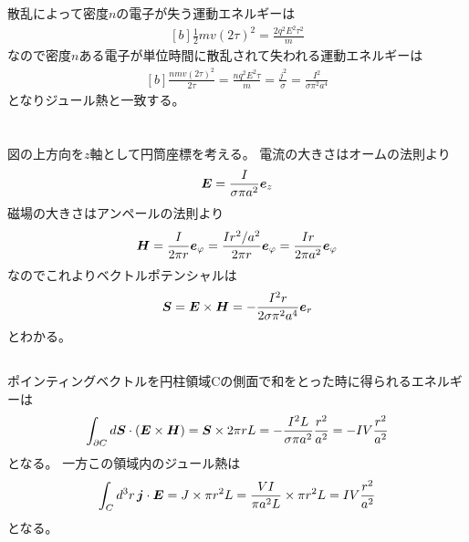 \documentclass[../ap_2012.tex]{subfiles}
\begin{document}
散乱によって密度\(n\)の電子が失う運動エネルギーは
\begin{equation}\begin{aligned}[b]
    \frac{1}{2}mv(2\tau)^2=\frac{2q^2E^2\tau^2}{m}
\end{aligned}\end{equation}
なので密度\(n\)ある電子が単位時間に散乱されて失われる運動エネルギーは
\begin{equation}\begin{aligned}[b]
    \frac{nmv(2\tau)^2}{2\tau}=\frac{nq^2E^2\tau}{m}=\frac{j^2}{\sigma}= \frac{I^2}{\sigma\pi^2 a^4}
\end{aligned}\end{equation}
となりジュール熱と一致する。

\section{}
\subsection{}
図の上方向を\(z\)軸として円筒座標を考える。
電流の大きさはオームの法則より
\begin{equation}\begin{aligned}[b]
    \vb*{E} =\frac{I}{\sigma \pi a^2}\vb*{e}_z
\end{aligned}\end{equation}
磁場の大きさはアンペールの法則より
\begin{equation}\begin{aligned}[b]
    \vb*{H} = \frac{I}{2\pi r}\vb*{e}_\varphi
    = \frac{Ir^2/a^2}{2\pi r}\vb*{e}_\varphi
    = \frac{Ir}{2\pi a^2}\vb*{e}_\varphi
\end{aligned}\end{equation}
なのでこれよりベクトルポテンシャルは
\begin{equation}\begin{aligned}[b]
    \vb*{S} = \vb*{E}\times \vb*{H} = -\frac{I^2r}{2\sigma\pi^2 a^4}\vb*{e}_r
\end{aligned}\end{equation}
とわかる。
\subsection{}
ポインティングベクトルを円柱領域Cの側面で和をとった時に得られるエネルギーは
\begin{equation}\begin{aligned}[b]
    \int_{\partial C} d\vb*{S}\cdot(\vb*{E}\times \vb*{H})
    = \vb*{S}\times 2\pi r L
    = -\frac{I^2L}{\sigma\pi a^2}\frac{r^2}{a^2}
    = -IV \frac{r^2}{a^2}
\end{aligned}\end{equation}
となる。
一方この領域内のジュール熱は
\begin{equation}\begin{aligned}[b]
    \int_C d^3 r \,\vb*{j}\cdot \vb*{E}
    = J \times \pi r^2 L
    = \frac{VI}{\pi a^2L} \times \pi r^2 L
    = IV \frac{r^2}{a^2}
\end{aligned}\end{equation}
となる。
\end{document}
